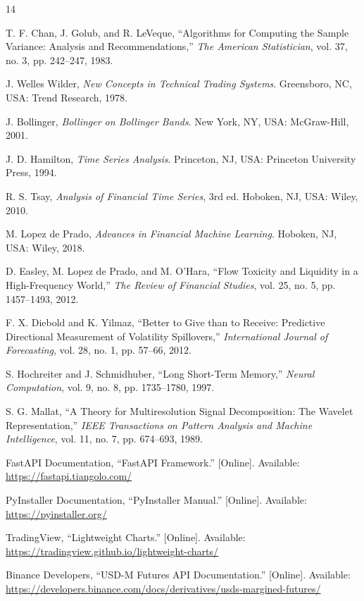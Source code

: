 \documentclass[conference]{IEEEtran}
\begin{document}
\begin{thebibliography}{14}

T. F. Chan, J. Golub, and R. LeVeque, ``Algorithms for Computing the Sample
Variance: Analysis and Recommendations,'' \emph{The American Statistician},
vol. 37, no. 3, pp. 242--247, 1983.

J. Welles Wilder, \emph{New Concepts in Technical Trading Systems}.
Greensboro, NC, USA: Trend Research, 1978.

J. Bollinger, \emph{Bollinger on Bollinger Bands}. New York, NY, USA:
McGraw-Hill, 2001.

J. D. Hamilton, \emph{Time Series Analysis}. Princeton, NJ, USA: Princeton
University Press, 1994.

R. S. Tsay, \emph{Analysis of Financial Time Series}, 3rd ed. Hoboken, NJ,
USA: Wiley, 2010.

M. Lopez de Prado, \emph{Advances in Financial Machine Learning}. Hoboken,
NJ, USA: Wiley, 2018.

D. Easley, M. Lopez de Prado, and M. O'Hara, ``Flow Toxicity and Liquidity
in a High-Frequency World,'' \emph{The Review of Financial Studies}, vol. 25,
no. 5, pp. 1457--1493, 2012.

F. X. Diebold and K. Yilmaz, ``Better to Give than to Receive: Predictive
Directional Measurement of Volatility Spillovers,'' \emph{International
Journal of Forecasting}, vol. 28, no. 1, pp. 57--66, 2012.

S. Hochreiter and J. Schmidhuber, ``Long Short-Term Memory,'' \emph{Neural
Computation}, vol. 9, no. 8, pp. 1735--1780, 1997.

S. G. Mallat, ``A Theory for Multiresolution Signal Decomposition: The
Wavelet Representation,'' \emph{IEEE Transactions on Pattern Analysis and
Machine Intelligence}, vol. 11, no. 7, pp. 674--693, 1989.

FastAPI Documentation, ``FastAPI Framework.'' [Online]. Available:
\url{https://fastapi.tiangolo.com/}

PyInstaller Documentation, ``PyInstaller Manual.'' [Online]. Available:
\url{https://pyinstaller.org/}

TradingView, ``Lightweight Charts.'' [Online]. Available:
\url{https://tradingview.github.io/lightweight-charts/}

Binance Developers, ``USD-M Futures API Documentation.'' [Online]. Available:
\url{https://developers.binance.com/docs/derivatives/usds-margined-futures/}

\end{thebibliography}
\end{document}
